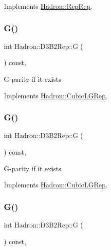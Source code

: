 Implements \mbox{\hyperlink{structHadron_1_1RepRep_a92c8802e5ed7afd7da43ccfd5b7cd92b}{Hadron\+::\+Rep\+Rep}}.

\mbox{\label{structHadron_1_1D3B2Rep_ac12858607dfa7833b4f2a6961139e1b9}} 
\subsubsection{\texorpdfstring{G()}{G()}\hspace{0.1cm}{\footnotesize\ttfamily [1/3]}}
{\footnotesize\ttfamily int Hadron\+::\+D3\+B2\+Rep\+::G (\begin{DoxyParamCaption}{ }\end{DoxyParamCaption}) const\hspace{0.3cm}{\ttfamily [inline]}, {\ttfamily [virtual]}}

G-\/parity if it exists 

Implements \mbox{\hyperlink{structHadron_1_1CubicLGRep_ace26f7b2d55e3a668a14cb9026da5231}{Hadron\+::\+Cubic\+L\+G\+Rep}}.

\mbox{\label{structHadron_1_1D3B2Rep_ac12858607dfa7833b4f2a6961139e1b9}} 
\subsubsection{\texorpdfstring{G()}{G()}\hspace{0.1cm}{\footnotesize\ttfamily [2/3]}}
{\footnotesize\ttfamily int Hadron\+::\+D3\+B2\+Rep\+::G (\begin{DoxyParamCaption}{ }\end{DoxyParamCaption}) const\hspace{0.3cm}{\ttfamily [inline]}, {\ttfamily [virtual]}}

G-\/parity if it exists 

Implements \mbox{\hyperlink{structHadron_1_1CubicLGRep_ace26f7b2d55e3a668a14cb9026da5231}{Hadron\+::\+Cubic\+L\+G\+Rep}}.

\mbox{\label{structHadron_1_1D3B2Rep_ac12858607dfa7833b4f2a6961139e1b9}} 
\subsubsection{\texorpdfstring{G()}{G()}\hspace{0.1cm}{\footnotesize\ttfamily [3/3]}}
{\footnotesize\ttfamily int Hadron\+::\+D3\+B2\+Rep\+::G (\begin{DoxyParamCaption}{ }\end{DoxyParamCaption}) const\hspace{0.3cm}{\ttfamily [inline]}, {\ttfamily [virtual]}}


